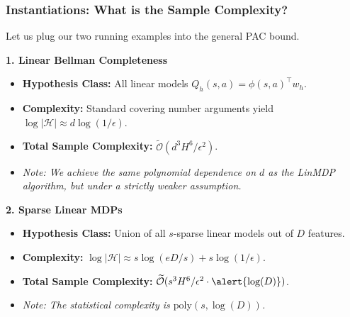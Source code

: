 \documentclass[aspectratio=169]{beamer}
\begin{document}
\begin{frame}\frametitle{Instantiations: What is the Sample Complexity?}

Let us plug our two running examples into the general PAC bound.

\vspace{0.2cm}
\pause
\textbf{1. Linear Bellman Completeness}
\begin{itemize}
    \item \textbf{Hypothesis Class:} All linear models $Q_{h}(s,a) = \phi(s,a)^\top w_h$.
    \item \textbf{Complexity:} Standard covering number arguments yield $\log|\mathcal{H}| \approx d \log(1/\epsilon)$.
    \item \textbf{Total Sample Complexity:} $\widetilde{\mathcal{O}}(d^3 H^6 / \epsilon^2)$.
    \item \textit{Note: We achieve the same polynomial dependence on $d$ as the LinMDP algorithm, but under a strictly weaker assumption.}
\end{itemize}

\vspace{0.2cm}
\pause
\textbf{2. Sparse Linear MDPs}
\begin{itemize}
    \item \textbf{Hypothesis Class:} Union of all $s$-sparse linear models out of $D$ features.
    \item \textbf{Complexity:} $\log|\mathcal{H}| \approx s \log(eD/s) + s \log(1/\epsilon)$.
    \item \textbf{Total Sample Complexity:} $\widetilde{\mathcal{O}}(s^3 H^6 / \epsilon^2 \cdot \alert{\log(D)})$.
    \item \alert{\textit{Note: The statistical complexity is $\textrm{poly}(s,\log(D))$.}}
\end{itemize}

\end{frame}
\end{document}
